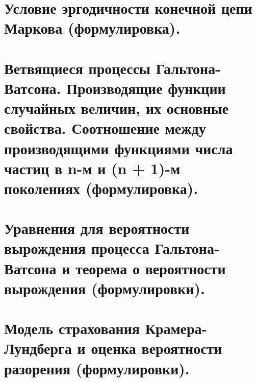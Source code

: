 \section{Условие эргодичности конечной цепи Маркова (формулировка).}

\newpage{}

\section{Ветвящиеся процессы Гальтона-Ватсона. Производящие функции случайных величин, их основные свойства. Соотношение между производящими функциями числа частиц в n-м и (n + 1)-м поколениях (формулировка).}

\newpage{}

\section{Уравнения для вероятности вырождения процесса Гальтона-Ватсона и теорема о вероятности вырождения (формулировки).}

\newpage{}

\section{Модель страхования Крамера-Лундберга и оценка вероятности разорения (формулировки).}

\newpage{}


